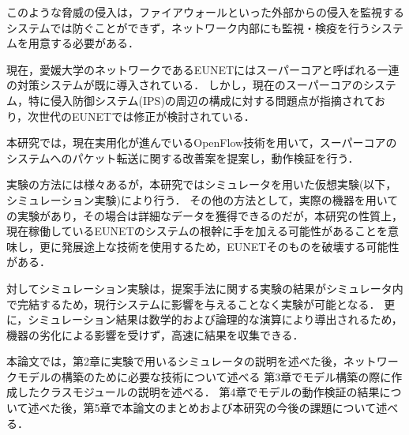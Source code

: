 このような脅威の侵入は，ファイアウォールといった外部からの侵入を監視するシステムでは防ぐことができず，ネットワーク内部にも監視・検疫を行うシステムを用意する必要がある．

現在，愛媛大学のネットワークであるEUNETにはスーパーコアと呼ばれる一連の対策システムが既に導入されている．
しかし，現在のスーパーコアのシステム，特に侵入防御システム(IPS)の周辺の構成に対する問題点が指摘されており，次世代のEUNETでは修正が検討されている．

本研究では，現在実用化が進んでいるOpenFlow技術を用いて，スーパーコアのシステムへのパケット転送に関する改善案を提案し，動作検証を行う．

実験の方法には様々あるが，本研究ではシミュレータを用いた仮想実験(以下，シミュレーション実験)により行う．
その他の方法として，実際の機器を用いての実験があり，その場合は詳細なデータを獲得できるのだが，本研究の性質上，現在稼働しているEUNETのシステムの根幹に手を加える可能性があることを意味し，更に発展途上な技術を使用するため，EUNETそのものを破壊する可能性がある．

対してシミュレーション実験は，提案手法に関する実験の結果がシミュレータ内で完結するため，現行システムに影響を与えることなく実験が可能となる．
更に，シミュレーション結果は数学的および論理的な演算により導出されるため，機器の劣化による影響を受けず，高速に結果を収集できる．

本論文では，第2章に実験で用いるシミュレータの説明を述べた後，ネットワークモデルの構築のために必要な技術について述べる
第3章でモデル構築の際に作成したクラスモジュールの説明を述べる．
第4章でモデルの動作検証の結果について述べた後，第5章で本論文のまとめおよび本研究の今後の課題について述べる．